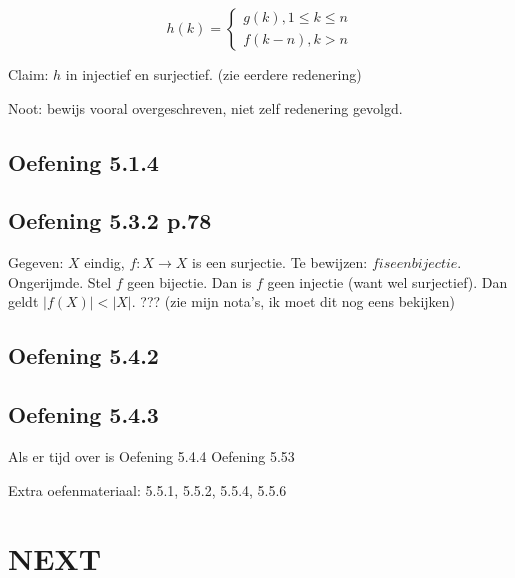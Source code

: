 \documentclass{article}
\begin{document}
\[ 
h(k)= \left\{ 
\begin{aligned}
g(k) , 1 \leq k \leq n \\
f(k-n) , k > n
\end{aligned} 
\right.\]

Claim: $h$ in injectief en surjectief. (zie eerdere redenering) 

Noot: bewijs vooral overgeschreven, niet zelf redenering gevolgd. 


\subsection{Oefening 5.1.4}

\subsection{Oefening 5.3.2 p.78}
Gegeven: $X$ eindig, $f:X \rightarrow X$ is een surjectie. Te bewijzen: $f is een bijectie$. 
Ongerijmde. Stel $f$ geen bijectie. Dan is $f$ geen injectie (want wel surjectief). Dan geldt $|f(X)| < |X|$. ???
(zie mijn nota's, ik moet dit nog eens bekijken) 


\subsection{Oefening 5.4.2}

\subsection{Oefening 5.4.3}

Als er tijd over is
Oefening 5.4.4
Oefening 5.53 



Extra oefenmateriaal: 5.5.1, 5.5.2, 5.5.4, 5.5.6



\section*{NEXT}
\end{document}
